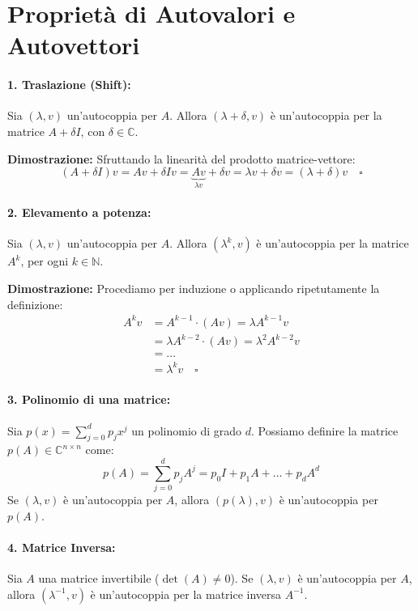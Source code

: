 \documentclass[a4paper,12pt]{article}
\begin{document}
	\section{Proprietà di Autovalori e Autovettori}
	
	\paragraph{1. Traslazione (Shift):}
	Sia $(\lambda, v)$ un'autocoppia per $A$. Allora $(\lambda + \delta, v)$ è un'autocoppia per la matrice $A + \delta I$, con $\delta \in \mathbb{C}$.
	
	\medskip
	\noindent \textbf{Dimostrazione:}
	Sfruttando la linearità del prodotto matrice-vettore:
	\begin{equation*}
		(A + \delta I) v = Av + \delta Iv = \underbrace{Av}_{\lambda v} + \delta v = \lambda v + \delta v = (\lambda + \delta) v \quad \square
	\end{equation*}
	
	\paragraph{2. Elevamento a potenza:}
	Sia $(\lambda, v)$ un'autocoppia per $A$. Allora $(\lambda^k, v)$ è un'autocoppia per la matrice $A^k$, per ogni $k \in \mathbb{N}$.
	
	\medskip
	\noindent \textbf{Dimostrazione:}
	Procediamo per induzione o applicando ripetutamente la definizione:
	\begin{align*}
		A^k v &= A^{k-1} \cdot (Av) = \lambda A^{k-1} v \\
		&= \lambda A^{k-2} \cdot (Av) = \lambda^2 A^{k-2} v \\
		&= \dots \\
		&= \lambda^k v \quad \square
	\end{align*}
	\paragraph{3. Polinomio di una matrice:}
	Sia $p(x) = \sum_{j=0}^{d} p_j x^j$ un polinomio di grado $d$. Possiamo definire la matrice $p(A) \in \mathbb{C}^{n \times n}$ come:
	\begin{equation}
		p(A) = \sum_{j=0}^{d} p_j A^j = p_0 I + p_1 A + \dots + p_d A^d
	\end{equation}
	Se $(\lambda, v)$ è un'autocoppia per $A$, allora $(p(\lambda), v)$ è un'autocoppia per $p(A)$.
	
	\paragraph{4. Matrice Inversa:}
	Sia $A$ una matrice invertibile ($\det(A) \neq 0$). Se $(\lambda, v)$ è un'autocoppia per $A$, allora $(\lambda^{-1}, v)$ è un'autocoppia per la matrice inversa $A^{-1}$.
	
\end{document}
